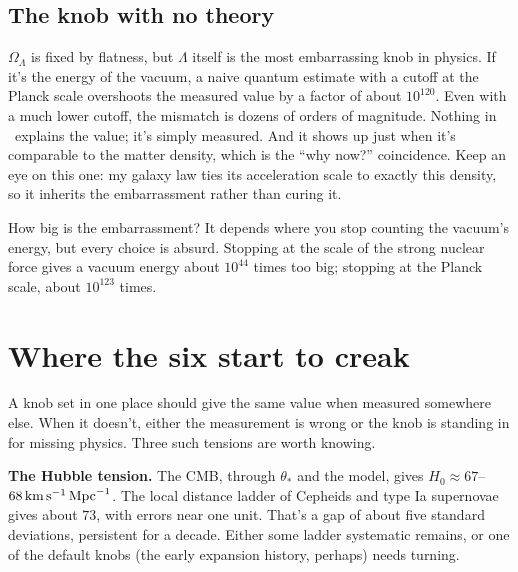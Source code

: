 \subsection{The knob with no theory}

$\Omega_\Lambda$ is fixed by flatness, but $\Lambda$ itself is the most embarrassing knob in physics. If it's the energy of the vacuum, a naive quantum estimate with a cutoff at the Planck scale overshoots the measured value by a factor of about $10^{120}$. Even with a much lower cutoff, the mismatch is dozens of orders of magnitude. Nothing in \LCDM\ explains the value; it's simply measured. And it shows up just when it's comparable to the matter density, which is the ``why now?'' coincidence. Keep an eye on this one: my galaxy law ties its acceleration scale to exactly this density, so it inherits the embarrassment rather than curing it.

How big is the embarrassment? It depends where you stop counting the vacuum's energy, but every choice is absurd. Stopping at the scale of the strong nuclear force gives a vacuum energy about $10^{44}$ times too big; stopping at the Planck scale, about $10^{123}$ times.





\section{Where the six start to creak}

A knob set in one place should give the same value when measured somewhere else. When it doesn't, either the measurement is wrong or the knob is standing in for missing physics. Three such tensions are worth knowing.

\textbf{The Hubble tension.} The CMB, through $\theta_*$ and the model, gives $H_0\approx67$--$68\,\mathrm{km\,s^{-1}}\,\mathrm{Mpc}^{-1}$. The local distance ladder of Cepheids and type Ia supernovae gives about $73$, with errors near one unit. That's a gap of about five standard deviations, persistent for a decade. Either some ladder systematic remains, or one of the default knobs (the early expansion history, perhaps) needs turning.



